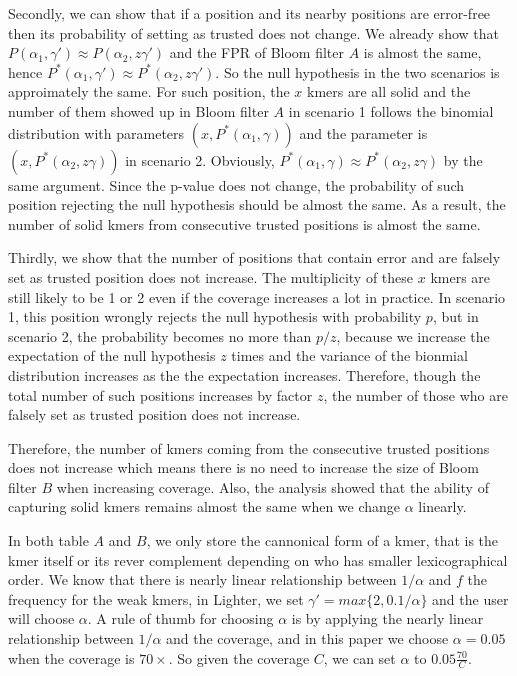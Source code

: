 \documentclass[10pt]{article}
\begin{document}
Secondly, we can show that if a position and its nearby positions are error-free then its probability of setting as trusted does not change. We already show that $P(\alpha_1,\gamma')\approx P(\alpha_2,z\gamma')$ and the FPR of Bloom filter $A$ is almost the same, hence $P^*(\alpha_1,\gamma')\approx P^*(\alpha_2,z\gamma')$. So the null hypothesis in the two scenarios is approimately the same. For such position, the $x$ kmers are all solid and the number of them showed up in Bloom filter $A$ in scenario 1 follows the binomial distribution with parameters $(x, P^*(\alpha_1, \gamma))$ and the parameter is $(x, P^*(\alpha_2, z\gamma))$ in scenario 2. Obviously, $P^*(\alpha_1, \gamma)\approx P^*(\alpha_2, z\gamma)$ by the same argument. Since the p-value does not change, the probability of such position rejecting the null hypothesis should be almost the same. As a result, the number of solid kmers from consecutive trusted positions is almost the same. 

Thirdly, we show that the number of positions that contain error and are falsely set as trusted position does not increase. The multiplicity of these $x$ kmers are still likely to be 1 or 2 even if the coverage increases a lot in practice. In scenario 1, this position wrongly rejects the null hypothesis with probability $p$, but in scenario 2, the probability becomes no more than $p/z$, because we increase the expectation of the null hypothesis $z$ times and the variance of the bionmial distribution increases as the the expectation increases. Therefore, though the total number of such positions increases by factor $z$, the number of those who are falsely set as trusted position does not increase.

Therefore, the number of kmers coming from the consecutive trusted positions does not increase which means there is no need to increase the size of Bloom filter $B$ when increasing coverage. Also, the analysis showed that the ability of capturing solid kmers remains almost the same when we change $\alpha$ linearly. 

In both table $A$ and $B$, we only store the cannonical form of a kmer, that is the kmer itself or its rever complement depending on who has smaller lexicographical order. We know that there is nearly linear relationship between $1/\alpha$ and $f$ the frequency for the weak kmers, in Lighter, we set $\gamma'=max\{2,0.1/\alpha\}$ and the user will choose $\alpha$. A rule of thumb for choosing $\alpha$ is by applying the nearly linear relationship between $1/\alpha$ and the coverage, and in this paper we choose $\alpha=0.05$ when the coverage is $70\times$. So given the coverage $C$, we can set $\alpha$ to $0.05\frac{70}{C}$. 
\end{document}
